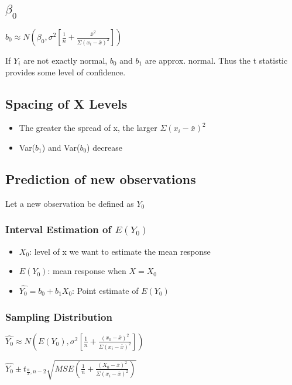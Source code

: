 \documentclass[11pt]{article}
\begin{document}
\subsection{\(\beta_0\)}
\label{sec:orgdc792a1}

\(b_0 \approx N(\beta_0, \sigma^2[\frac{1}{n} + \frac{\bar{x}^2}{\Sigma (x_i - \bar{x})^2}])\)

If \(Y_i\) are not exactly normal, \(b_0\) and \(b_1\) are approx. normal. Thus the t
statistic provides some level of confidence.

\subsection{Spacing of X Levels}
\label{sec:orgcd47ad8}
\begin{itemize}
\item The greater the spread of x, the larger \(\Sigma (x_i - \bar{x})^2\)
\item Var(\(b_1\)) and Var(\(b_0\)) decrease
\end{itemize}

\subsection{Prediction of new observations}
\label{sec:org96e98c9}
Let a new observation be defined as \(Y_0\)

\subsubsection{Interval Estimation of \(E(Y_0)\)}
\label{sec:org56abf68}
\begin{itemize}
\item \(X_0\): level of x we want to estimate the mean response
\item \(E(Y_0)\): mean response when \(X = X_0\)
\item \(\hat{Y_0} = b_0 + b_1 X_0\): Point estimate of \(E(Y_0)\)
\end{itemize}

\subsubsection{Sampling Distribution}
\label{sec:org3371cce}
\(\hat{Y_0} \approx N(E(Y_0), \sigma^2 [\frac{1}{n} + \frac{(x_0 - \bar{x})^2}{\Sigma
(x_i - \bar{x})^2}])\)

\(\hat{Y_0} \pm t_{\frac{\alpha}{2}, n - 2} \sqrt{MSE (\frac{1}{n} + \frac{(X_0 -
\bar{x})^2}{\Sigma (x_i - \bar{x})^2})}\)
\end{document}
